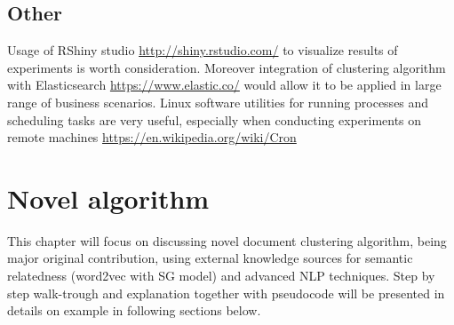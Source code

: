 \documentclass[a4paper, 12pt, oneside]{Thesis} %
\begin{document}
\section{Other} Usage of RShiny studio \url{http://shiny.rstudio.com/} to visualize results of experiments is worth consideration. Moreover integration of clustering algorithm with Elasticsearch \url{https://www.elastic.co/} would allow it to be applied in large range of business scenarios. Linux software utilities for running processes and scheduling tasks are very useful, especially when conducting experiments on remote machines \url{https://en.wikipedia.org/wiki/Cron} 

\chapter{Novel algorithm} This chapter will focus on discussing novel document clustering algorithm, being major original contribution, using external knowledge sources for semantic relatedness (word2vec with SG model) and advanced NLP techniques. Step by step walk-trough and explanation together with pseudocode will be presented in details on example in following sections below. 
\end{document}
